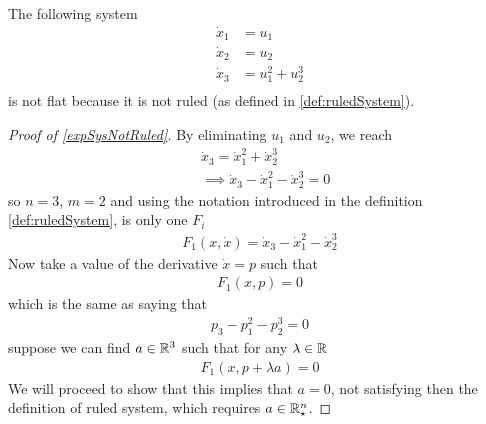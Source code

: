 \documentclass[12pt]{article}
\begin{document}
\begin{example} \label{expSysNotRuled}
  The following system
  \begin{equation}\begin{aligned}
    \dot{x}_1 &= u_1 \\
    \dot{x}_2 &= u_2 \\
    \dot{x}_3 &= u_1^2 + u_2^3 \\
  \end{aligned}\end{equation}
  is not flat because it is not ruled (as defined in \ref{def:ruledSystem}).
\end{example}
\begin{proof}[ Proof of \ref{expSysNotRuled}]
  By eliminating $u_1$ and $u_2$, we reach
  \begin{equation}\begin{aligned}
    &\dot{x}_3 = \dot{x}_1^2 + \dot{x}_2^3 \\
    &\implies \dot{x}_3 - \dot{x}_1^2 - \dot{x}_2^3 = 0
  \end{aligned}\end{equation}
  so $n=3$, $m=2$ and using the notation introduced in the definition
  \ref{def:ruledSystem}, is only one $F_i$
  \begin{equation}\begin{aligned}
    F_1(x,\dot{x}) = \dot{x}_3 - \dot{x}_1^2 - \dot{x}_2^3
  \end{aligned}\end{equation}
  Now take a value of the derivative $\dot{x}=p$ such that
  \begin{equation}\begin{aligned}
    F_1(x,p) = 0  
  \end{aligned}\end{equation}
  which is the same as saying that
  \begin{equation}\begin{aligned}
    p_3 - p_1^2 - p_2^3 = 0
  \end{aligned}\end{equation}
  suppose we can find $a \in \mathbb{R}^3$ such that for any $\lambda \in \mathbb{R}$
  \begin{equation}\begin{aligned}
    F_1(x,p + \lambda a) = 0 
  \end{aligned}\end{equation}
  We will proceed to show that this implies that $a=0$, not satisfying then the definition of ruled system, which requires $a \in \mathbb{R}_\star^n$.
  

\end{proof}
\end{document}
